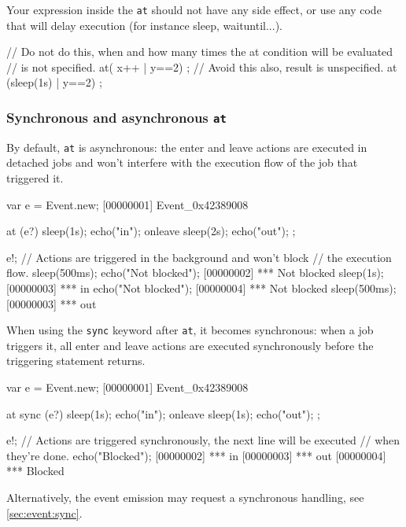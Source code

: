 Your expression inside the \lstinline{at} should not have any side effect,
or use any code that will delay execution (for instance sleep, waituntil...).

\begin{urbiunchecked}
// Do not do this, when and how many times the at condition will be evaluated
// is not specified.
at( x++ | y==2) {};
// Avoid this also, result is unspecified.
at (sleep(1s) | y==2) {};
\end{urbiunchecked}


\subsubsection{Synchronous and asynchronous \lstinline{at}}
\label{sec:lang:at:sync-async}

By default, \lstinline{at} is asynchronous: the enter and leave actions are
executed in detached jobs and won't interfere with the execution flow of the
job that triggered it.

\begin{urbiscript}[firstnumber=1]
var e = Event.new;
[00000001] Event_0x42389008

at (e?)
{
  sleep(1s);
  echo("in");
}
onleave
{
  sleep(2s);
  echo("out");
};

e!;
// Actions are triggered in the background and won't block
// the execution flow.
sleep(500ms);
echo("Not blocked");
[00000002] *** Not blocked
sleep(1s);
[00000003] *** in
echo("Not blocked");
[00000004] *** Not blocked
sleep(500ms);
[00000003] *** out
\end{urbiscript}

When using the \lstinline{sync} keyword after \lstinline{at}, it becomes
synchronous: when a job triggers it, all enter and leave actions are
executed synchronously before the triggering statement returns.

\begin{urbiscript}[firstnumber=1]
var e = Event.new;
[00000001] Event_0x42389008

at sync (e?)
{
  sleep(1s);
  echo("in");
}
onleave
{
  sleep(1s);
  echo("out");
};

e!;
// Actions are triggered synchronously, the next line will be executed
// when they're done.
echo("Blocked");
[00000002] *** in
[00000003] *** out
[00000004] *** Blocked
\end{urbiscript}

Alternatively, the event emission may request a synchronous handling, see
\autoref{sec:event:sync}.


